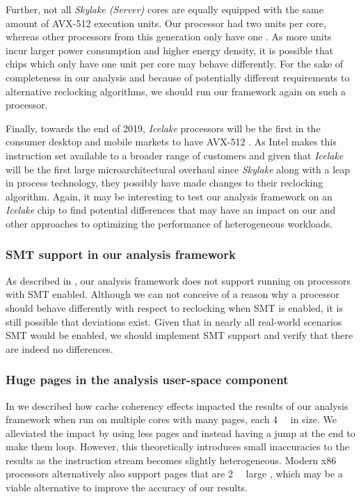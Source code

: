 Further, not all \textit{Skylake (Server)} cores are equally equipped with the same amount of \gls{AVX-512} execution units. Our processor had two units per core, whereas other processors from this generation only have one \cite{intelxeonscalabledeepdive}. As more units incur larger power consumption and higher energy density, it is possible that chips which only have one unit per core may behave differently. For the sake of completeness in our analysis and because of potentially different requirements to alternative reclocking algorithms, we should run our framework again on such a processor.

Finally, towards the end of 2019, \textit{Icelake} processors will be the first in the consumer desktop and mobile markets to have \gls{AVX-512} \cite{thicelake}. As Intel makes this instruction set available to a broader range of customers and given that \textit{Icelake} will be the first large microarchitectural overhaul since \textit{Skylake} along with a leap in process technology, they possibly have made changes to their reclocking algorithm. Again, it may be interesting to test our analysis framework on an \textit{Icelake} chip to find potential differences that may have an impact on our and other approaches to optimizing the performance of heterogeneous workloads.

\subsubsection{SMT support in our analysis framework}
\label{sec:conclusion:futurework:smt}

As described in , our analysis framework does not support running on processors with \gls{SMT} enabled. Although we can not conceive of a reason why a processor should behave differently with respect to reclocking when \gls{SMT} is enabled, it is still possible that deviations exist. Given that in nearly all real-world scenarios \gls{SMT} would be enabled, we should implement \gls{SMT} support and verify that there are indeed no differences.

\subsubsection{Huge pages in the analysis user-space component}
\label{sec:conclusion:futurework:hugepages}

In  we described how cache coherency effects impacted the results of our analysis framework when run on multiple cores with many pages, each \SI{4}{\kibi\byte} in size. We alleviated the impact by using less pages and instead having a jump at the end to make them loop. However, this theoretically introduces small inaccuracies to the results as the instruction stream becomes slightly heterogeneous. Modern \gls{x86} processors alternatively also support pages that are \SI{2}{\mebi\byte} large \cite{intelsdmsysprogguide}, which may be a viable alternative to improve the accuracy of our results.

